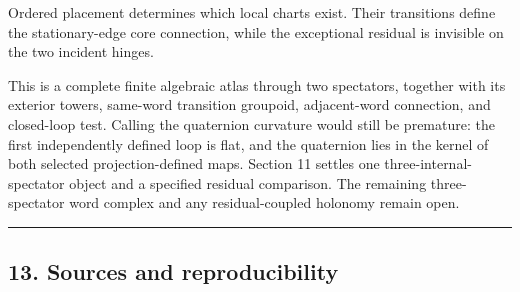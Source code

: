 \documentclass[
  11pt,
  a4paper,
]{article}
\begin{document}
Ordered placement determines which local charts exist. Their transitions
define the stationary-edge core connection, while the exceptional
residual is invisible on the two incident hinges.

This is a complete finite algebraic atlas through two spectators,
together with its exterior towers, same-word transition groupoid,
adjacent-word connection, and closed-loop test. Calling the quaternion
curvature would still be premature: the first independently defined loop
is flat, and the quaternion lies in the kernel of both selected
projection-defined maps. Section 11 settles one three-internal-spectator
object and a specified residual comparison. The remaining
three-spectator word complex and any residual-coupled holonomy remain
open.

\begin{center}\rule{0.5\linewidth}{0.5pt}\end{center}

\newpage

\hypertarget{sources-and-reproducibility}{%
\subsection{13. Sources and
reproducibility}\label{sources-and-reproducibility}}
\end{document}
